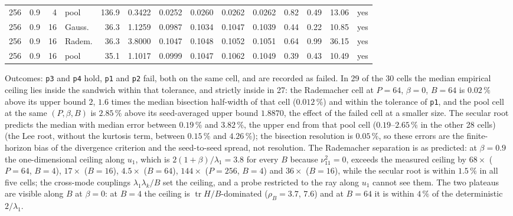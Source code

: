 \documentclass[11pt]{article}
\theoremstyle{remark}
\newcommand{\tr}{\operatorname{tr}}
\begin{document}
\begin{table}[!htbp]
{\begin{tabular}{rrrlrrrrrrrrrl}
256 & 0.9 & 4 & pool & 136.9 & 0.3422 & 0.0252 & 0.0260 & 0.0262 & 0.0262 & 0.82 & 0.49 & 13.06 & yes \\
256 & 0.9 & 16 & Gauss. & 36.3 & 1.1259 & 0.0987 & 0.1034 & 0.1047 & 0.1039 & 0.44 & 0.22 & 10.85 & yes \\
256 & 0.9 & 16 & Radem. & 36.3 & 3.8000 & 0.1047 & 0.1048 & 0.1052 & 0.1051 & 0.64 & 0.99 & 36.15 & yes \\
256 & 0.9 & 16 & pool & 35.1 & 1.1017 & 0.0999 & 0.1047 & 0.1062 & 0.1049 & 0.39 & 0.43 & 10.49 & yes \\
\bottomrule
\end{tabular}}
\end{table}

Outcomes: \texttt{p3} and \texttt{p4} hold, \texttt{p1} and \texttt{p2} fail, both on the same cell, and are recorded as failed. In 29 of the 30 cells the median empirical ceiling lies inside the sandwich within that tolerance, and strictly inside in 27: the Rademacher cell at $P=64$, $\beta=0$, $B=64$ is $0.02\,\%$ above its upper bound $2$, $1.6$ times the median bisection half-width of that cell ($0.012\,\%$) and within the tolerance of \texttt{p1}, and the pool cell at the same $(P,\beta,B)$ is $2.85\,\%$ above its seed-averaged upper bound $1.8870$, the effect of the failed cell at a smaller size. The secular root predicts the median with median error between $0.19\,\%$ and $3.82\,\%$, the upper end from that pool cell ($0.19$--$2.65\,\%$ in the other 28 cells) (the Lee root, without the kurtosis term, between $0.15\,\%$ and $4.26\,\%$); the bisection resolution is $0.05\,\%$, so these errors are the finite-horizon bias of the divergence criterion and the seed-to-seed spread, not resolution. The Rademacher separation is as predicted: at $\beta=0.9$ the one-dimensional ceiling along $u_1$, which is $2(1+\beta)/\lambda_1=3.8$ for every $B$ because $\nu_{11}^2=0$, exceeds the measured ceiling by $68\times$ ($P=64$, $B=4$), $17\times$ ($B=16$), $4.5\times$ ($B=64$), $144\times$ ($P=256$, $B=4$) and $36\times$ ($B=16$), while the secular root is within $1.5\,\%$ in all five cells; the cross-mode couplings $\lambda_1\lambda_k/B$ set the ceiling, and a probe restricted to the ray along $u_1$ cannot see them. The two plateaus are visible along $B$ at $\beta=0$: at $B=4$ the ceiling is $\tr H/B$-dominated ($\rho_B=3.7$, $7.6$) and at $B=64$ it is within $4\,\%$ of the deterministic $2/\lambda_1$.
\end{document}
